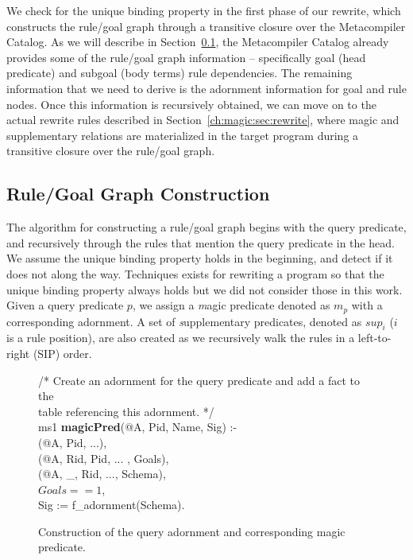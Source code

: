 We check for the unique binding property in the first phase of our rewrite,
which constructs the rule/goal graph through a transitive closure over the
Metacompiler Catalog.  As we will describe in
Section~\ref{ch:magic:sec:rgconstruct}, the Metacompiler Catalog already
provides some of the rule/goal graph information -- specifically goal (head
predicate) and subgoal (body terms) rule dependencies.  The remaining
information that we need to derive is the adornment information for goal
and rule nodes.  Once this information is recursively obtained, we can move on
to the actual rewrite rules described in Section~\ref{ch:magic:sec:rewrite},
where magic and supplementary relations are materialized in the target program
during a transitive closure over the rule/goal graph.

\subsection{Rule/Goal Graph Construction}
\label{ch:magic:sec:rgconstruct}

The algorithm for constructing a rule/goal graph begins with the query
predicate, and recursively through the rules that mention the query predicate
in the head.  We assume the unique binding property holds in the beginning, and
detect if it does not along the way.  Techniques exists for rewriting a program
so that the unique binding property always holds but we did not consider those
in this work.  Given a query predicate $p$, we assign a {\emph magic predicate}
denoted as $m_p$ with a corresponding adornment.  A set of {\emph supplementary
predicates}, denoted as $sup_i$ ($i$ is a rule position), are also created as
we recursively walk the rules in a left-to-right (SIP) order.


\begin{figure}[!t]
\ssp
\centering
\begin{boxedminipage}{\linewidth}

/* Create an adornment for the query predicate and add a fact to the \\
 table referencing this adornment. */ \\
ms1 {\bf magicPred}(@A, Pid, Name, Sig) :- \\
(@A, Pid, ...), \\
(@A, Rid, Pid, ... , Goals), \\
(@A, \_, Rid, ..., Schema), \\
\datalogspace $Goals == 1$, \\
\datalogspace Sig := f\_adornment(Schema).
	
\end{boxedminipage}
\caption{\label{ch:magic:fig:magic1}Construction of the query adornment and corresponding magic predicate.}
\end{figure}

